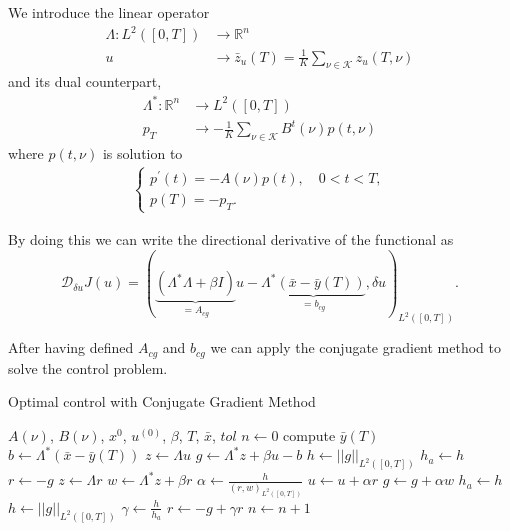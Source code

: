 \documentclass[10pt,a4paper]{article}
\begin{document}
We introduce the linear operator
%
\begin{equation}
\begin{split}
\Lambda: L^2 \left( [0, T] \right) & \rightarrow \mathbb{R}^n \\
u & \rightarrow \bar{z}_u \left( T \right) = \frac{1}{K} \sum_{\nu \in \mathcal{K}} z_u \left( T, \nu \right)
\end{split}
\end{equation}
%
and its dual counterpart,
%
\begin{equation}
\begin{split}
\Lambda^*: \mathbb{R}^n & \rightarrow L^2 \left( [0, T] \right) \\
p_T & \rightarrow  - \frac{1}{K} \sum_{\nu \in \mathcal{K}} B^t \left( \nu \right) p \left( t, \nu \right)
\end{split}
\end{equation}
%
where $p\left(t, \nu\right)$ is solution to
%
\begin{align}
\begin{cases}
p^\prime \left( t \right) = -A \left( \nu \right) p \left( t \right), \quad 0 < t <T, \\
p{\left( T \right)} = - p_T.
\end{cases}
\end{align}

By doing this we can write the directional derivative of the functional as
%
\begin{equation}
\mathcal{D}_{\delta u }J \left( u \right) = \left( \underbrace{\left( \Lambda^* \Lambda + \beta I \right)}_{=A_{cg}} u - \underbrace{\Lambda^*\left( \bar{x} - \bar{y} \left( T \right) \right)}_{=b_{cg}}, \delta u \right)_{L^2\left(\left[0,T\right]\right)}.
\end{equation}

After having defined $A_{cg}$ and $b_{cg}$ we can apply the conjugate gradient method to solve the control problem.

\begin{algorithm}
\caption{Optimal control with Conjugate Gradient Method}\label{CGalgorithm}
\begin{algorithmic}[1]
\Require $A\left( \nu \right)$, $B\left( \nu \right)$, $x^0$, $u^{\left(0\right)}$, $\beta$, $T$, $\bar{x}$, $tol$
\State $n \gets 0 $
\State compute $\bar{y} \left( T \right)$
\State $b \gets \Lambda^*\left( \bar{x} - \bar{y} \left( T \right) \right)$
\State $z \gets \Lambda u$
\State $g \gets \Lambda^*z + \beta u - b$
\State $h \gets ||g||_{L^2\left(\left[0,T\right]\right)}$
\State $h_a \gets h$
\State $r \gets -g$
\State $z \gets \Lambda r$
\State $w \gets \Lambda^*z + \beta r$
\State $\alpha \gets \frac{h}{\left(r,w\right)_{L^2\left(\left[0,T\right]\right)}}$
\State $u \gets u + \alpha r$
\State $g \gets g + \alpha w$
\State $h_a \gets h$
\State $h \gets ||g||_{L^2\left(\left[0,T\right]\right)}$
\State $\gamma \gets \frac{h}{h_a}$
\State $r \gets -g + \gamma r$
\State $n \gets n + 1$
\EndWhile

\end{algorithmic}
\end{algorithm}
\end{document}

